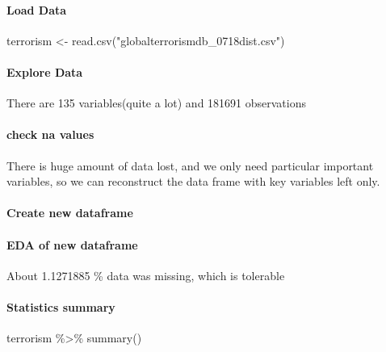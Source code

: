 \documentclass[
]{article}
\newenvironment{Shaded}{\begin{snugshade}}{\end{snugshade}}
\newcommand{\FunctionTok}[1]{\textcolor[rgb]{0.00,0.00,0.00}{#1}}
\newcommand{\NormalTok}[1]{#1}
\newcommand{\OtherTok}[1]{\textcolor[rgb]{0.56,0.35,0.01}{#1}}
\newcommand{\SpecialCharTok}[1]{\textcolor[rgb]{0.00,0.00,0.00}{#1}}
\newcommand{\StringTok}[1]{\textcolor[rgb]{0.31,0.60,0.02}{#1}}
\begin{document}
\hypertarget{load-data}{%
\paragraph{Load Data}\label{load-data}}

\begin{Shaded}
\begin{Highlighting}[]
\NormalTok{terrorism }\OtherTok{\textless{}{-}} \FunctionTok{read.csv}\NormalTok{(}\StringTok{"globalterrorismdb\_0718dist.csv"}\NormalTok{)}
\end{Highlighting}
\end{Shaded}

\hypertarget{explore-data}{%
\paragraph{Explore Data}\label{explore-data}}

There are 135 variables(quite a lot) and 181691 observations

\hypertarget{check-na-values}{%
\paragraph{check na values}\label{check-na-values}}

There is huge amount of data lost, and we only need particular important
variables, so we can reconstruct the data frame with key variables left
only.

\hypertarget{create-new-dataframe}{%
\paragraph{Create new dataframe}\label{create-new-dataframe}}

\hypertarget{eda-of-new-dataframe}{%
\paragraph{EDA of new dataframe}\label{eda-of-new-dataframe}}

About 1.1271885 \% data was missing, which is tolerable

\hypertarget{statistics-summary}{%
\paragraph{Statistics summary}\label{statistics-summary}}

\begin{Shaded}
\begin{Highlighting}[]
\NormalTok{terrorism }\SpecialCharTok{\%\textgreater{}\%}
  \FunctionTok{summary}\NormalTok{()}
\end{Highlighting}
\end{Shaded}
\end{document}
